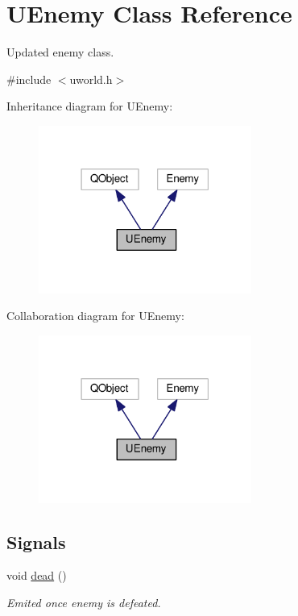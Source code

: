 \hypertarget{classUEnemy}{}\section{U\+Enemy Class Reference}
\label{classUEnemy}


Updated enemy class.  




{\ttfamily \#include $<$uworld.\+h$>$}



Inheritance diagram for U\+Enemy\+:
\nopagebreak
\begin{figure}[H]
\begin{center}
\leavevmode
\includegraphics[width=198pt]{da/d90/classUEnemy__inherit__graph}
\end{center}
\end{figure}


Collaboration diagram for U\+Enemy\+:
\nopagebreak
\begin{figure}[H]
\begin{center}
\leavevmode
\includegraphics[width=198pt]{d5/d7a/classUEnemy__coll__graph}
\end{center}
\end{figure}
\subsection*{Signals}
\begin{DoxyCompactItemize}
\item 
void \hyperlink{classUEnemy_aa00c76b00d33570ade0136e60beaf9a5}{dead} ()\hypertarget{classUEnemy_aa00c76b00d33570ade0136e60beaf9a5}{}\label{classUEnemy_aa00c76b00d33570ade0136e60beaf9a5}

\begin{DoxyCompactList}\small\item\em Emited once enemy is defeated. \end{DoxyCompactList}\end{DoxyCompactItemize}
